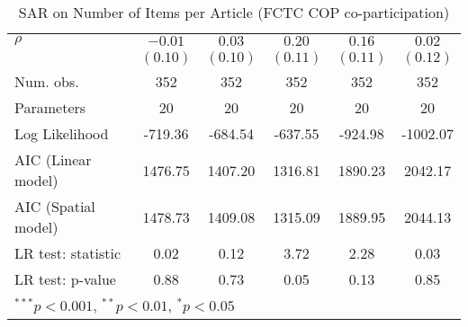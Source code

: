 \begin{table}[!h]
\begin{center}
\begin{tabular}{l c c c c c }
$\rho$                  & $-0.01$      & $0.03$       & $0.20$       & $0.16$       & $0.02$       \\
                        & $(0.10)$     & $(0.10)$     & $(0.11)$     & $(0.11)$     & $(0.12)$     \\
\midrule
Num. obs.               & 352          & 352          & 352          & 352          & 352          \\
Parameters              & 20           & 20           & 20           & 20           & 20           \\
Log Likelihood          & -719.36      & -684.54      & -637.55      & -924.98      & -1002.07     \\
AIC (Linear model)      & 1476.75      & 1407.20      & 1316.81      & 1890.23      & 2042.17      \\
AIC (Spatial model)     & 1478.73      & 1409.08      & 1315.09      & 1889.95      & 2044.13      \\
LR test: statistic      & 0.02         & 0.12         & 3.72         & 2.28         & 0.03         \\
LR test: p-value        & 0.88         & 0.73         & 0.05         & 0.13         & 0.85         \\
\bottomrule
\multicolumn{6}{l}{\scriptsize{$^{***}p<0.001$, $^{**}p<0.01$, $^*p<0.05$}}
\end{tabular}
\caption{SAR on Number of Items per Article (FCTC COP co-participation)}
\label{table:coefficients}
\end{center}
\end{table}
